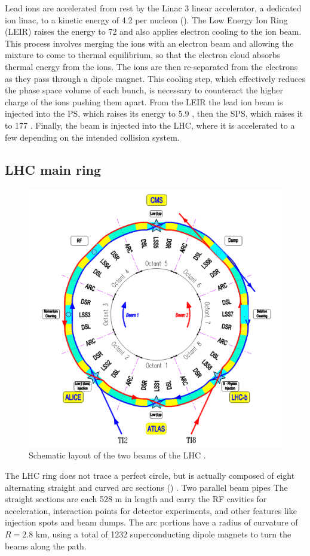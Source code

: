 Lead ions are accelerated from rest by the Linac 3 linear accelerator, a dedicated ion linac, to a kinetic energy of 4.2 \MeV per nucleon (\MeVn).
The Low Energy Ion Ring (LEIR) raises the energy to 72 \MeVn and also applies electron cooling to the ion beam.
This process involves merging the ions with an electron beam and allowing the mixture to come to thermal equilibrium, so that the electron cloud absorbs thermal energy from the ions.
The ions are then re-separated from the electrons as they pass through a dipole magnet.
This cooling step, which effectively reduces the phase space volume of each bunch, is necessary to counteract the higher charge of the ions pushing them apart. %
From the LEIR the lead ion beam is injected into the PS, which raises its energy to 5.9 \GeVn, then the SPS, which raises it to 177 \GeVn.
Finally, the beam is injected into the LHC, where it is accelerated to a few \TeVn depending on the intended collision system.


\subsection{LHC main ring}

\begin{figure}[t]
\includegraphics[width=0.8\linewidth]{LHC_schematic.png}
\caption{Schematic layout of the two beams of the LHC \cite{Bruning:2004ej}.}
\label{fig:lhc_schematic}
\end{figure}

The LHC ring does not trace a perfect circle, but is actually composed of eight alternating straight and curved arc sections (\Fig{\ref{lhc_schematic}}) \cite{Bruning:2004ej}.
Two parallel beam pipes 
The straight sections are each 528 m in length and carry the RF cavities for acceleration, interaction points for detector experiments, and other features like injection spots and beam dumps.
The arc portions have a radius of curvature of $R = 2.8$ km, using a total of 1232 superconducting dipole magnets to turn the beams along the path.

